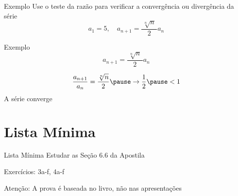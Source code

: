 \addtocounter{exemplo}{1}
\begin{frame}{Exemplo \theexemplo}
  Use o teste da razão para verificar a convergência ou divergência da série
  \[
    a_1 = 5,
    \quad
    a_{n+1} = \frac{\,\sqrt[n]{n}\,}{2} a_n
  \]
\end{frame}

\begin{frame}{Exemplo \theexemplo}
  \[
    a_{n+1} = \frac{\,\sqrt[n]{n}\,}{2} a_n
  \]

  \pause
  \[
    \frac{a_{n+1}}{a_n}
    = \frac{\sqrt[n]{n}}{2}
    \pause
    \to \frac{1}{2}
    \pause
    < 1
  \]
  A série converge
\end{frame}

\section{Lista Mínima}

\begin{frame}{Lista Mínima}
  Estudar as Seção 6.6 da Apostila

  \vspace{\baselineskip}
  Exercícios: 3a-f, 4a-f

  \vfill
  Atenção: A prova é baseada no livro, não nas apresentações
\end{frame}


